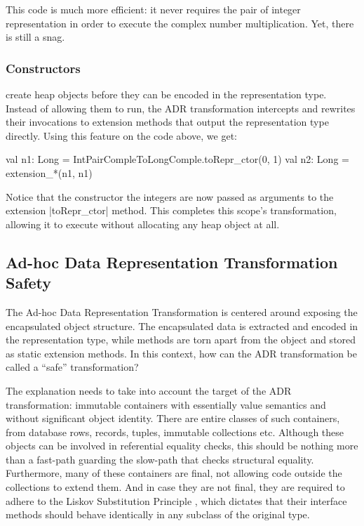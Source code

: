 This code is much more efficient: it never requires the pair of integer representation in order to execute the complex number multiplication. Yet, there is still a snag.

\subsubsection{Constructors} create heap objects before they can be encoded in the representation type. Instead of allowing them to run, the ADR transformation intercepts and rewrites their invocations to extension methods that output the representation type directly. Using this feature on the code above, we get:

\begin{lstlisting-nobreak}
val n1: Long = IntPairCompleToLongComple.toRepr_ctor(0, 1)
val n2: Long = extension_*(n1, n1)
\end{lstlisting-nobreak}

Notice that the constructor the integers are now passed as arguments to the extension |toRepr_ctor| method. This completes this scope's transformation, allowing it to execute without allocating any heap object at all.

\subsection{Ad-hoc Data Representation Transformation Safety}

The Ad-hoc Data Representation Transformation is centered around exposing the encapsulated object structure. The encapsulated data is extracted and encoded in the representation type, while methods are torn apart from the object and stored as static extension methods. In this context, how can the ADR transformation be called a ``safe'' transformation?

The explanation needs to take into account the target of the ADR transformation: immutable containers with essentially value semantics and without significant object identity. There are entire classes of such containers, from database rows, records, tuples, immutable collections etc. Although these objects can be involved in referential equality checks, this should be nothing more than a fast-path guarding the slow-path that checks structural equality. Furthermore, many of these containers are final, not allowing code outside the collections to extend them. And in case they are not final, they are required to adhere to the Liskov Substitution Principle \cite{liskov-substitution-principle}, which dictates that their interface methods should behave identically in any subclass of the original type.

